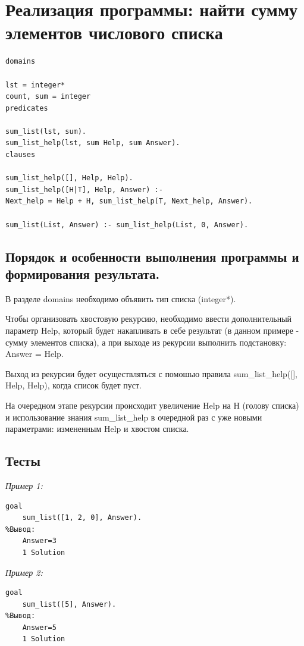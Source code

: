 \documentclass[a4paper,12pt]{article}
\begin{document}
\section*{Реализация программы: найти сумму элементов числового списка}

\begin{verbatim}
domains

lst = integer*
count, sum = integer
predicates

sum_list(lst, sum).
sum_list_help(lst, sum Help, sum Answer).
clauses

sum_list_help([], Help, Help).
sum_list_help([H|T], Help, Answer) :-
Next_help = Help + H, sum_list_help(T, Next_help, Answer).

sum_list(List, Answer) :- sum_list_help(List, 0, Answer).
\end{verbatim}

\subsection*{Порядок и особенности выполнения программы и формирования результата.}

В разделе domains необходимо объявить тип списка (integer*).

Чтобы организовать хвостовую рекурсию, необходимо ввести дополнительный параметр Help, который будет накапливать в себе результат (в данном примере - сумму элементов списка), а при выходе из рекурсии выполнить подстановку: Answer = Help.

Выход из рекурсии будет осуществляться с помошью правила sum\_list\_help([], Help, Help), когда список будет пуст.

На очередном этапе рекурсии происходит увеличение Help на H (голову списка) и использование знания sum\_list\_help в очередной раз с уже новыми параметрами: измененным Help и хвостом списка.

\subsection*{Тесты}

\textit{Пример 1:}

\begin{verbatim}
goal
	sum_list([1, 2, 0], Answer).
%Вывод:
	Answer=3
	1 Solution
\end{verbatim}

\textit{Пример 2:}

\begin{verbatim}
goal
	sum_list([5], Answer).
%Вывод:
	Answer=5
	1 Solution
\end{verbatim}
\end{document}

